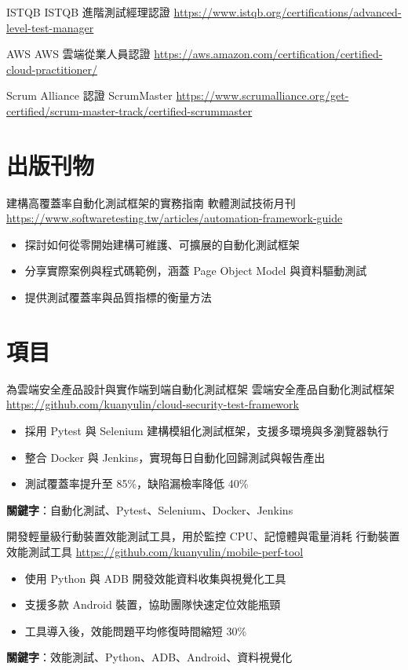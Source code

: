 \documentclass[a4paper, serif, 10pt]{moderncv}
\begin{document}
        {ISTQB}
        {ISTQB 進階測試經理認證}
        {\url{https://www.istqb.org/certifications/advanced-level-test-manager}}
        {}
        {}

        {AWS}
        {AWS 雲端從業人員認證}
        {\url{https://aws.amazon.com/certification/certified-cloud-practitioner/}}
        {}
        {}

        {Scrum Alliance}
        {認證 ScrumMaster}
        {\url{https://www.scrumalliance.org/get-certified/scrum-master-track/certified-scrummaster}}
        {}
        {}
\section{出版刊物}

        {建構高覆蓋率自動化測試框架的實務指南}
        {軟體測試技術月刊}
        {\url{https://www.softwaretesting.tw/articles/automation-framework-guide}}
        {}
        {\begin{itemize}
\item 探討如何從零開始建構可維護、可擴展的自動化測試框架
\item 分享實際案例與程式碼範例，涵蓋 Page Object Model 與資料驅動測試
\item 提供測試覆蓋率與品質指標的衡量方法
\end{itemize}}
\section{項目}

        {為雲端安全產品設計與實作端到端自動化測試框架}
        {雲端安全產品自動化測試框架}
        {\url{https://github.com/kuanyulin/cloud-security-test-framework}}
        {}
        {\begin{itemize}
\item 採用 Pytest 與 Selenium 建構模組化測試框架，支援多環境與多瀏覽器執行
\item 整合 Docker 與 Jenkins，實現每日自動化回歸測試與報告產出
\item 測試覆蓋率提升至 85\%，缺陷漏檢率降低 40\%
\end{itemize}
\textbf{關鍵字}：自動化測試、Pytest、Selenium、Docker、Jenkins}

        {開發輕量級行動裝置效能測試工具，用於監控 CPU、記憶體與電量消耗}
        {行動裝置效能測試工具}
        {\url{https://github.com/kuanyulin/mobile-perf-tool}}
        {}
        {\begin{itemize}
\item 使用 Python 與 ADB 開發效能資料收集與視覺化工具
\item 支援多款 Android 裝置，協助團隊快速定位效能瓶頸
\item 工具導入後，效能問題平均修復時間縮短 30\%
\end{itemize}
\textbf{關鍵字}：效能測試、Python、ADB、Android、資料視覺化}
\end{document}
